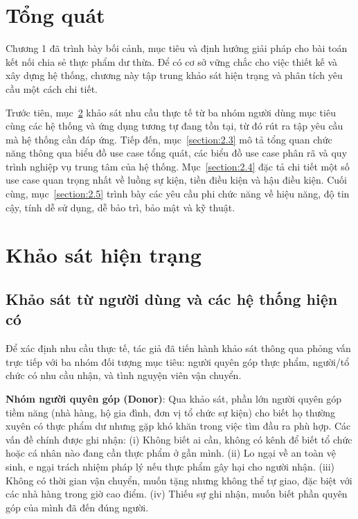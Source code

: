 \documentclass[../main.tex]{subfiles}%
\begin{document}
\setcounter{chapter}{2}
\section{Tổng quát}
\label{section:2.1}
Chương 1 đã trình bày bối cảnh, mục tiêu và định hướng giải pháp cho bài toán kết nối chia sẻ thực phẩm dư thừa. Để có cơ sở vững chắc cho việc thiết kế và xây dựng hệ thống, chương này tập trung khảo sát hiện trạng và phân tích yêu cầu một cách chi tiết.

Trước tiên, mục~\ref{section:2.2} khảo sát nhu cầu thực tế từ ba nhóm người dùng mục tiêu cùng các hệ thống và ứng dụng tương tự đang tồn tại, từ đó rút ra tập yêu cầu mà hệ thống cần đáp ứng. Tiếp đến, mục~\ref{section:2.3} mô tả tổng quan chức năng thông qua biểu đồ use case tổng quát, các biểu đồ use case phân rã và quy trình nghiệp vụ trung tâm của hệ thống. Mục~\ref{section:2.4} đặc tả chi tiết một số use case quan trọng nhất về luồng sự kiện, tiền điều kiện và hậu điều kiện. Cuối cùng, mục~\ref{section:2.5} trình bày các yêu cầu phi chức năng về hiệu năng, độ tin cậy, tính dễ sử dụng, dễ bảo trì, bảo mật và kỹ thuật.

\section{Khảo sát hiện trạng}
\label{section:2.2}

\subsection{Khảo sát từ người dùng và các hệ thống hiện có}
\label{subsection:2.2.1}
Để xác định nhu cầu thực tế, tác giả đã tiến hành khảo sát thông qua phỏng vấn trực tiếp với ba nhóm đối tượng mục tiêu: người quyên góp thực phẩm, người/tổ chức có nhu cầu nhận, và tình nguyện viên vận chuyển.

\textbf{Nhóm người quyên góp (Donor)}: Qua khảo sát, phần lớn người quyên góp tiềm năng (nhà hàng, hộ gia đình, đơn vị tổ chức sự kiện) cho biết họ thường xuyên có thực phẩm dư nhưng gặp khó khăn trong việc tìm đầu ra phù hợp. Các vấn đề chính được ghi nhận: (i) Không biết ai cần, không có kênh để biết tổ chức hoặc cá nhân nào đang cần thực phẩm ở gần mình. (ii) Lo ngại về an toàn vệ sinh, e ngại trách nhiệm pháp lý nếu thực phẩm gây hại cho người nhận. (iii) Không có thời gian vận chuyển, muốn tặng nhưng không thể tự giao, đặc biệt với các nhà hàng trong giờ cao điểm. (iv) Thiếu sự ghi nhận, muốn biết phần quyên góp của mình đã đến đúng người.
\end{document}
